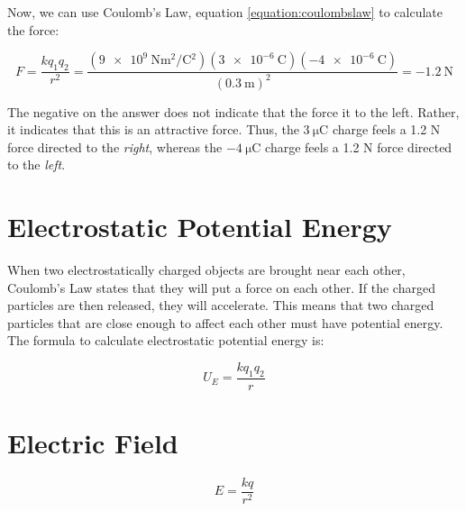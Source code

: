 \begin{mdframed}[backgroundcolor=blue!10!white]
		Now, we can use Coulomb's Law, equation \ref{equation:coulombslaw} to calculate the force:
		
			\begin{equation*}
		F = \frac{kq_1q_2}{r^2} = \frac{(\SI{9e9}{\N\m^2\per\coulomb^2})(\SI{3e-6}{\coulomb})(\SI{-4e-6}{\coulomb})}{(\SI{0.3}{\m})^2} = \boxed{\SI{-1.2}{\N}}
		\end{equation*}
		
		The negative on the answer does not indicate that the force it to the left.  Rather, it indicates that this is an attractive force.  Thus, the $\SI{3}{\micro\coulomb}$ charge feels a 1.2 N force directed to the \textit{right}, whereas the $\SI{-4}{\micro\coulomb}$ charge feels a 1.2 N force directed to the \textit{left}.
		
	\end{mdframed}
	
	
	
	
	
	
	\section{Electrostatic Potential Energy}
	
	When two electrostatically charged objects are brought near each other, Coulomb's Law states that they will put a force on each other.  If the charged particles are then released, they will accelerate.  This means that two charged particles that are close enough to affect each other must have potential energy.  The formula to calculate electrostatic potential energy is:
	
	
	\begin{mdframed}[backgroundcolor=orange!20!white]
		
		\begin{equation}
		U_E = \frac{kq_1q_2}{r}
		\label{equation:electrostaticpotentialenergy}
		\end{equation}
	\end{mdframed}	
	
	
	
	
	\section{Electric Field}  
	
		\begin{mdframed}[backgroundcolor=orange!20!white]
		
		\begin{equation}
		{E} = \frac{kq}{r^2}
		\label{equation:electrostaticfield}
		\end{equation}
	\end{mdframed}	
	
